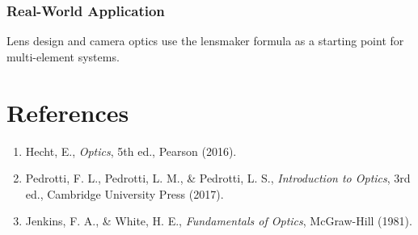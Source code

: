 \documentclass[12pt,a4paper]{article}
\begin{document}
\subsubsection*{Real-World Application}
Lens design and camera optics use the lensmaker formula as a starting point for multi-element systems.

\newpage

\section*{References}
\begin{enumerate}
  \item Hecht, E., \emph{Optics}, 5th ed., Pearson (2016).
  \item Pedrotti, F. L., Pedrotti, L. M., \& Pedrotti, L. S., \emph{Introduction to Optics}, 3rd ed., Cambridge University Press (2017).
  \item Jenkins, F. A., \& White, H. E., \emph{Fundamentals of Optics}, McGraw-Hill (1981).
\end{enumerate}
\end{document}
